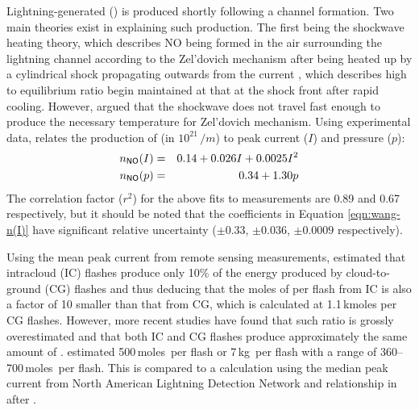 	Lightning-generated  ({\lnox}) is produced shortly following a channel formation. Two main theories exist in explaining such production. The first being the shockwave heating theory, which describes NO being formed in the air surrounding the lightning channel according to the Zel'dovich mechanism after being heated up by a cylindrical shock propagating outwards from the current \citep[][and references therein]{Borucki:1984dq}, which describes high  to  equilibrium ratio begin maintained at that at the shock front after rapid cooling. However, \citet{Stark:1996bh} argued that the shockwave does not travel fast enough to produce the necessary temperature for Zel'dovich mechanism.  Using experimental data, \citet{Wang:1998ve} relates the production of  (in $10^{21}\,\unit{/m}$) to peak current ($I$) and pressure ($p$):
	\begin{eqnarray}
		n_{\chem{NO}}(I) &=& 0.14 + 0.026I + 0.0025I^2 \label{eqn:wang-n(I)} \\
		n_{\chem{NO}}(p) &=& 0.34 + 1.30 p \label{eqn:wang-n(p)}
	\end{eqnarray}
	The correlation factor ($r^2$) for the above fits to measurements are 0.89 and 0.67 respectively, but it should be noted that the coefficients in Equation \ref{eqn:wang-n(I)} have significant relative uncertainty ($\pm0.33$, $\pm0.036$, $\pm0.0009$ respectively).
	
	Using the mean peak current from remote sensing measurements, \citet{Price:1997fk} estimated that intracloud (IC) flashes produce only 10\% of the energy produced by cloud-to-ground (CG) flashes and thus deducing that the moles of  per flash from IC is also a factor of 10 smaller than that from CG, which is calculated at 1.1\,\unit{kmoles} per CG flashes. However, more recent studies have found that such ratio is grossly overestimated and that both IC and CG flashes produce approximately the same amount of . \citet{Ott:2010lo} estimated 500\,\unit{moles}\, per flash or 7\,\unit{kg}\, per flash with a range of 360--700\,\unit{moles}\, per flash. This is compared to a calculation using the median peak current from North American Lightning Detection Network \citep[NALDN;][]{Orville:2002uq} and relationship in \citet{Decaria:2000kl} after \citet{Wang:1998ve}.
	
